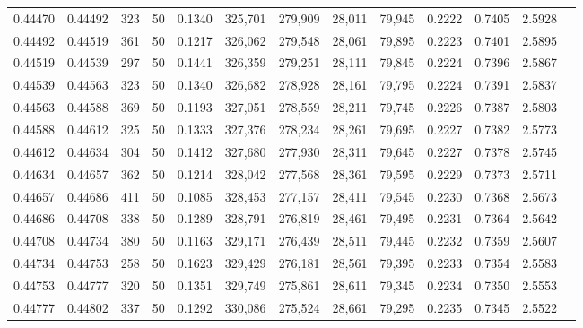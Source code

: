 \begin{tabular}{rrrrrrrrrrrrr}
0.44470 & 0.44492 &   323 &  50 &                                     0.1340 & 325,701 & 279,909 &  28,011 &  79,945 & 0.2222 & 0.7405 & 2.5928 \\
0.44492 & 0.44519 &   361 &  50 &                                     0.1217 & 326,062 & 279,548 &  28,061 &  79,895 & 0.2223 & 0.7401 & 2.5895 \\
0.44519 & 0.44539 &   297 &  50 &                                     0.1441 & 326,359 & 279,251 &  28,111 &  79,845 & 0.2224 & 0.7396 & 2.5867 \\
0.44539 & 0.44563 &   323 &  50 &                                     0.1340 & 326,682 & 278,928 &  28,161 &  79,795 & 0.2224 & 0.7391 & 2.5837 \\
0.44563 & 0.44588 &   369 &  50 &                                     0.1193 & 327,051 & 278,559 &  28,211 &  79,745 & 0.2226 & 0.7387 & 2.5803 \\
0.44588 & 0.44612 &   325 &  50 &                                     0.1333 & 327,376 & 278,234 &  28,261 &  79,695 & 0.2227 & 0.7382 & 2.5773 \\
0.44612 & 0.44634 &   304 &  50 &                                     0.1412 & 327,680 & 277,930 &  28,311 &  79,645 & 0.2227 & 0.7378 & 2.5745 \\
0.44634 & 0.44657 &   362 &  50 &                                     0.1214 & 328,042 & 277,568 &  28,361 &  79,595 & 0.2229 & 0.7373 & 2.5711 \\
0.44657 & 0.44686 &   411 &  50 &                                     0.1085 & 328,453 & 277,157 &  28,411 &  79,545 & 0.2230 & 0.7368 & 2.5673 \\
0.44686 & 0.44708 &   338 &  50 &                                     0.1289 & 328,791 & 276,819 &  28,461 &  79,495 & 0.2231 & 0.7364 & 2.5642 \\
0.44708 & 0.44734 &   380 &  50 &                                     0.1163 & 329,171 & 276,439 &  28,511 &  79,445 & 0.2232 & 0.7359 & 2.5607 \\
0.44734 & 0.44753 &   258 &  50 &                                     0.1623 & 329,429 & 276,181 &  28,561 &  79,395 & 0.2233 & 0.7354 & 2.5583 \\
0.44753 & 0.44777 &   320 &  50 &                                     0.1351 & 329,749 & 275,861 &  28,611 &  79,345 & 0.2234 & 0.7350 & 2.5553 \\
0.44777 & 0.44802 &   337 &  50 &                                     0.1292 & 330,086 & 275,524 &  28,661 &  79,295 & 0.2235 & 0.7345 & 2.5522 \\

\end{tabular}

